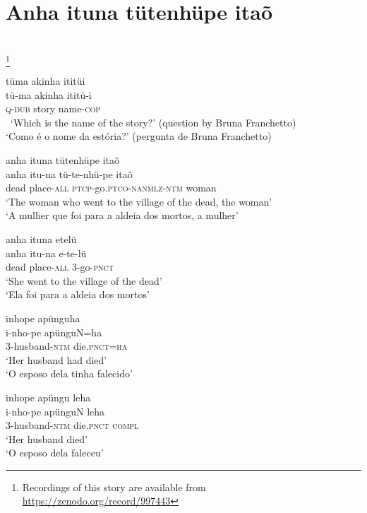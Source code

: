 \documentclass[output=paper,
modfonts,nonflat
]{langsci/langscibook}
\begin{document}
\section{Anha ituna tütenhüpe itaõ}
\\
\footnote{Recordings of this story are available from \url{https://zenodo.org/record/997443}}

\ea tüma akinha ititüi \\[.3em]
\gll
tü-ma		akinha ititü-i \\
\textsc{q-dub} 	story 	name-\textsc{cop} \\\
\glt ‘Which is the name of the story?’ 	(question by Bruna Franchetto) \\
‘Como é o nome da estória?’		(pergunta de Bruna Franchetto)\\
\z

\ea anha ituna tütenhüpe itaõ \\[.3em]
\gll
anha	itu-na		tü-te-nhü-pe				itaõ\\
dead	place-\textsc{all} 	\textsc{ptcp}-go.\textsc{ptco-nanmlz}-\textsc{ntm} 	woman\\
\glt ‘The woman who went to the village of the dead, the woman’ \\
‘A mulher que foi para a aldeia dos mortos, a mulher’ \\
\z

\ea anha ituna etelü\\[.3em]
\gll
anha	itu-na		e-te-lü \\
dead 	place-\textsc{all}	3-go-\textsc{pnct} \\
\glt ‘She went to the village of the dead’\\
‘Ela foi para a aldeia dos mortos’
\z

\ea inhope apünguha\\[.3em]
\gll
i-nho-pe		apünguN=ha\\
3-husband-\textsc{ntm}	die.\textsc{pnct=ha}\\
\glt ‘Her husband had died’\\
‘O esposo dela tinha falecido’\\
\z

\ea inhope apüngu leha\\[.3em]
\gll
i-nho-pe	apünguN	leha \\
3-husband-\textsc{ntm} 	die.\textsc{pnct} 	\textsc{compl}\\
\glt ‘Her husband died’ \\
‘O esposo dela faleceu’\\
\z
\end{document}
